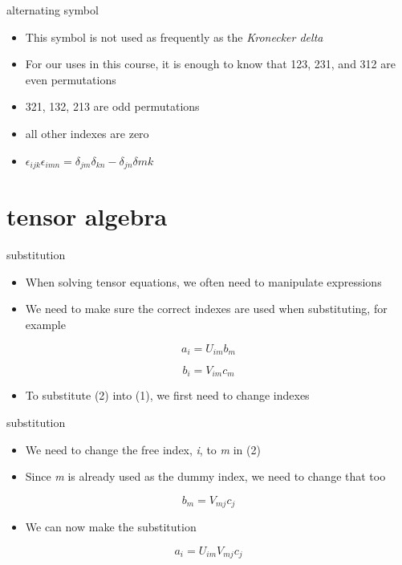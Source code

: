 \documentclass[
  letterpaper,
  ignorenonframetext,
  aspectratio=43,
  handout,
  12pt]{beamer}
\providecommand{\tightlist}{%
  \setlength{\itemsep}{0pt}\setlength{\parskip}{0pt}}
\providecommand{\tightlist}{%
\setlength{\itemsep}{0pt}\setlength{\parskip}{0pt}}
\begin{document}
\begin{frame}{alternating symbol}
\protect\hypertarget{alternating-symbol-1}{}
\begin{itemize}
\tightlist
\item
  This symbol is not used as frequently as the \emph{Kronecker delta}
\item
  For our uses in this course, it is enough to know that 123, 231, and
  312 are even permutations
\item
  321, 132, 213 are odd permutations
\item
  all other indexes are zero
\item
  \(\epsilon_{ijk} \epsilon_{imn} = \delta_{jm}\delta_{kn} - \delta_{jn}\delta{mk}\)
\end{itemize}
\end{frame}

\hypertarget{tensor-algebra}{%
\section{tensor algebra}\label{tensor-algebra}}

\begin{frame}{substitution}
\protect\hypertarget{substitution}{}
\begin{itemize}
\tightlist
\item
  When solving tensor equations, we often need to manipulate expressions
\item
  We need to make sure the correct indexes are used when substituting,
  for example
\end{itemize}

\[a_i = U_{im}{b_m} \label{eq:first} \tag{1}\]

\[b_i = V_{im}{c_m} \label{eq:second} \tag{2}\]

\begin{itemize}
\tightlist
\item
  To substitute (2) into (1), we first need to change indexes
\end{itemize}
\end{frame}

\begin{frame}{substitution}
\protect\hypertarget{substitution-1}{}
\begin{itemize}
\tightlist
\item
  We need to change the free index, \emph{i}, to \emph{m} in (2)
\item
  Since \emph{m} is already used as the dummy index, we need to change
  that too
\end{itemize}

\[b_m = V_{mj}{c_j} \label{eq:third} \tag{3}\]

\begin{itemize}
\tightlist
\item
  We can now make the substitution
\end{itemize}

\[a_i = U_{im}V_{mj}{c_j} \label{eq:fourth} \tag{4}\]
\end{frame}
\end{document}
